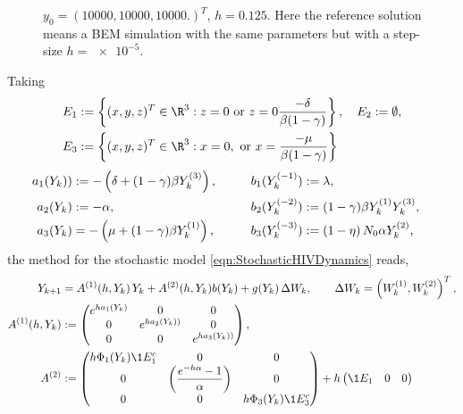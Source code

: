 \begin{example}
\begin{figure}[h!]
{			$y_0 = (
			\num{10000},%
			\num{10000},%
			\num{10000}.%
			)^T$,
			$h=\num{0.125}$.
			Here the reference solution means a BEM simulation
			with the same parameters but with a step-size $h=\num{e-5}$.
		}
		\label{fig:InternalHIVDynamics5e-1}
	\end{figure} 
	 Taking 
	\begin{align*}
		E_1&:=\left\{
			(x,y,z)^T \in \R^3:
			z=0 
			\text{ or }
			z=0
			\frac{-\delta}{\beta(1-\gamma)}
		\right\}, \quad
		E_2:=	\emptyset,   \\
		E_3&:=\left\{
			(x,y,z)^T \in \R^3: 
			x=0,
			\text{ or }
			x=
			\frac{-\mu}{\beta(1-\gamma)}
		\right\}
	\end{align*}
	\begin{align}
		a_{1}(Y_k)) &:= 
		-\left(
		\delta + (1 - \gamma) \beta Y_k^{(3)}
		\right),		
		& b_1(Y_k^{(-1)}) &:= \lambda, 
		& 
		\notag
		\\
		a_{2}(Y_k) &:= -\alpha,
		&b_2(Y_k^{(-2)}) & :=
		(1-\gamma) \beta Y_{k}^{(1)} Y_{k}^{(3)},
		\notag
		\\
		a_{3}(Y_k) &= 
		-
		\left(
		\mu + (1- \gamma) \beta Y_{k}^{(1)}
		\right),
		\qquad
		&b_{3}(Y_k^{(-3)}) &:= 
		\left(
		1 - \eta 
		\right)
		N_0 \alpha Y_{k}^{(2)},
		\notag			
	\end{align}
	the \SM method for the stochastic model \eqref{eqn:StochasticHIVDynamics} reads,
	\begin{align}
		Y_{k+1} &= A^{(1)}(h,Y_k) \,Y_k + A^{(2)}(h,Y_k)b(Y_k)+ g(Y_k)\, \Delta W_k,
		\qquad \Delta W_k = \left(W_k^{(1)}, W_k^{(2)}\right)^T, 
		\notag\\ 
		A^{(1)}(h,Y_k)&:=
		\begin{pmatrix}
			e^{ha_1(Y_k)}	&	0	&0 \\
			0	&e^{ha_2(Y_k))}	&0\\
			0	&0				&e^{ha_3(Y_k))}
		\end{pmatrix},
		\notag
		\\
		A^{(2)}&:=
		\begin{pmatrix}
			h \Phi_1(Y_k)\1{E_1^c}	&0	&0\\
			0 & 
			\left(\displaystyle
			\frac{e^{-h\alpha} - 1}{\alpha}
			\right) & 0\\
			0 & 0 & h \Phi_3(Y_k)\1{E_3^c} 
		\end{pmatrix}
		+h
		\begin{pmatrix}
			\1{E_1}	&0 			&0\\

\end{pmatrix}
\end{align}
\end{example}
